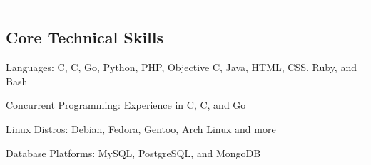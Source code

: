 \documentclass[10pt,letterpaper]{article}
\newenvironment{indentsection}[1]%
{\begin{list}{}%
	{\setlength{\leftmargin}{#1}}%
	\item[]%
}
{\end{list}}
\newcommand{\CPP}
{C\nolinebreak[4]\hspace{-.05em}\raisebox{.22ex}{\footnotesize\bf ++}}
\begin{document}
\hrule
\vspace{-0.4em}
\subsection*{Core Technical Skills}

\begin{indentsection}{\parindent}
\begin{description*}
	\item[Languages:]
	C, \CPP, Go, Python, PHP, Objective C, Java, HTML, CSS, Ruby, and Bash
	\item[Concurrent Programming:]
	Experience in C, \CPP, and Go
	\item[Linux Distros:]
	Debian, Fedora, Gentoo, Arch Linux and more
	\item[Database Platforms:]
	MySQL, PostgreSQL, and MongoDB
\end{description*}
\end{indentsection}
\end{document}
